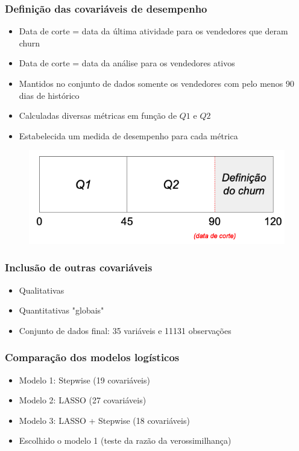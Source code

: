 \documentclass{beamer}
\begin{document}
\begin{frame}
    \frametitle{Definição das covariáveis de desempenho}
    \begin{itemize}
        \item Data de corte = data da última atividade para os vendedores que deram churn
        \item Data de corte = data da análise para os vendedores ativos
        \item Mantidos no conjunto de dados somente os vendedores com pelo menos 90 dias de histórico
        \item Calculadas diversas métricas em função de $Q1$ e $Q2$
        \item Estabelecida um medida de desempenho para cada métrica
    \end{itemize}
    \begin{figure}[!htb]
        \centering \includegraphics[scale=0.3]{quadrantes_desempenho.png}
    \end{figure}
\end{frame}

\begin{frame}
    \frametitle{Inclusão de outras covariáveis}
    \begin{itemize}
        \item Qualitativas
        \item Quantitativas "globais"
        \item Conjunto de dados final: 35 variáveis e 11131 observações
    \end{itemize}
\end{frame}

\begin{frame}
    \frametitle{Comparação dos modelos logísticos}
    \begin{itemize}
        \item Modelo 1: Stepwise (19 covariáveis)
        \item Modelo 2: LASSO (27 covariáveis)
        \item Modelo 3: LASSO + Stepwise (18 covariáveis)
        \item Escolhido o modelo 1 (teste da razão da verossimilhança)
    \end{itemize}
\end{frame}
\end{document}
